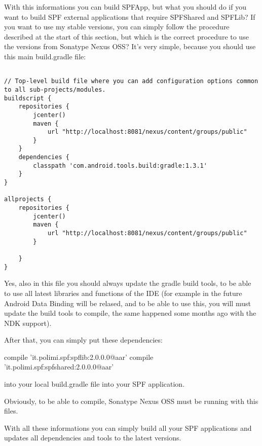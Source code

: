 With this informations you can build SPFApp, but what you should do if you want to build SPF external applications that require SPFShared and SPFLib?
If you want to use my stable versions, you can simply follow the procedure described at the start of this section, but which is the correct procedure to use the versions from Sonatype Nexus OSS?
It's very simple, because you should use this main build.gradle file:

\begin{lstlisting}
	
// Top-level build file where you can add configuration options common to all sub-projects/modules.
buildscript {
    repositories {
        jcenter()
        maven {
            url "http://localhost:8081/nexus/content/groups/public"
        }
    }
    dependencies {
        classpath 'com.android.tools.build:gradle:1.3.1'
    }
}

allprojects {
    repositories {
        jcenter()
        maven {
            url "http://localhost:8081/nexus/content/groups/public"
        }

    }
}
\end{lstlisting}

Yes, also in this file you should always update the gradle build tools, to be able to use all latest libraries and functions of the IDE (for example in the future Android Data Binding will be relased, and to be able to use this, you will must update the build tools to compile, the same happened some months ago with the NDK support).

After that, you can simply put these dependencies:

compile 'it.polimi.spf:spflib:2.0.0.0@aar'
compile 'it.polimi.spf:spfshared:2.0.0.0@aar'


into your local build.gradle file into your SPF application.

Obviously, to be able to compile, Sonatype Nexus OSS must be running with this files. 

With all these informations you can simply build all your SPF applications and updates all dependencies and tools to the latest versions.



